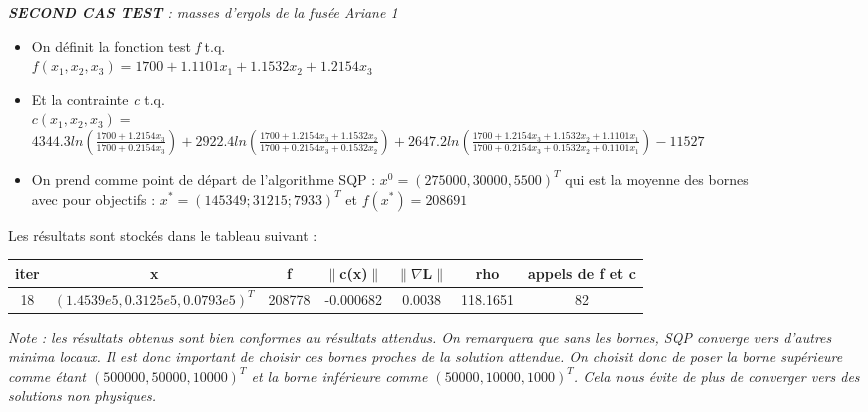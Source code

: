\begin{center}\emph{\textbf{SECOND CAS TEST} : masses d'ergols de la fusée Ariane 1}\\\end{center}





\begin{itemize}
\item On définit la fonction test \textit{f} t.q.\\
$f(x_1,x_2,x_3) = 1700+1.1101x_1 + 1.1532x_2 + 1.2154x_3$\\
\item Et la contrainte \textit{c} t.q.\\
$c(x_1,x_2,x_3) =$\\
\smallbreak
$4344.3ln(\frac{1700+1.2154x_3}{1700+0.2154x_3}) 
+ 2922.4ln(\frac{1700+1.2154x_3+1.1532x_2}{1700+0.2154x_3+0.1532x_2}) 
+ 2647.2ln(\frac{1700+1.2154x_3+1.1532x_2+1.1101x_1}{1700+0.2154x_3+0.1532x_2+0.1101x_1}) 
-11527$

\bigbreak

\item On prend comme point de départ de l'algorithme SQP : $x^0 = ( 275000,30000,5500)^{T}$ qui est la moyenne des bornes\\
\indent avec pour objectifs : $x^{*} = (145349 ; 31215 ; 7933)^{T}$ et $f(x^{*}) = 208691$\\
\end{itemize}
Les résultats sont stockés dans le tableau suivant : \smallbreak
{\renewcommand{\arraystretch}{1.5}
\begin{tabular}{|c|c|c|c|c|c|c|}
	\hline
 	iter & x & f & $\| $c(x)$ \|$ & $\|    \nabla $L$  \|$ & rho & appels de f et c\\
	\hline
 	18 & $(1.4539e5, 0.3125e5, 0.0793e5)^{T}$ & 208778 & -0.000682 & 0.0038 & 118.1651 & 82\\
	\hline
\end{tabular}
}
\bigbreak
\textit{Note : les résultats obtenus sont bien conformes au résultats attendus. On remarquera que sans les bornes, SQP converge vers d'autres minima locaux. Il est donc important de choisir ces bornes proches de la solution attendue. On choisit donc de poser la borne supérieure comme étant $(500000 , 50000 , 10000)^{T}$ et la borne inférieure comme $(50000 , 10000 , 1000)^{T}$. Cela nous évite de plus de converger vers des solutions non physiques.}
